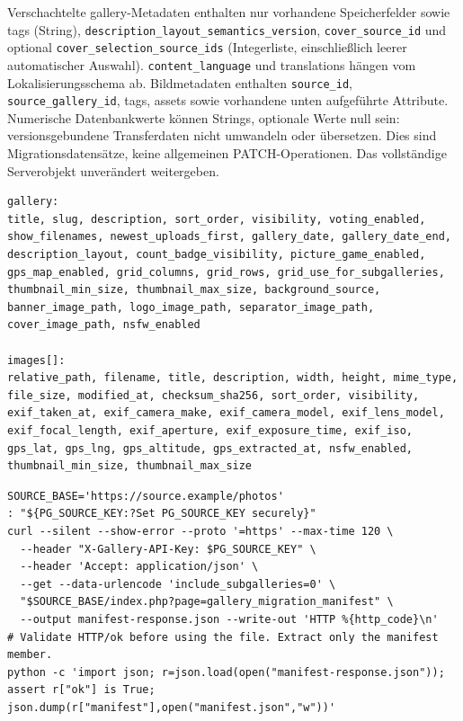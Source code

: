 \documentclass[11pt,a4paper]{article}
\newcommand{\codeword}[1]{\nolinkurl{#1}}
\begin{document}
Verschachtelte gallery-Metadaten enthalten nur vorhandene Speicherfelder sowie tags
(String), \codeword{description_layout_semantics_version}, \codeword{cover_source_id} und
optional \codeword{cover_selection_source_ids} (Integerliste, einschließlich leerer
automatischer Auswahl). \codeword{content_language} und translations hängen vom
Lokalisierungsschema ab. Bildmetadaten enthalten \codeword{source_id},
\codeword{source_gallery_id}, tags, assets sowie vorhandene unten aufgeführte Attribute.
Numerische Datenbankwerte können Strings, optionale Werte null sein: versionsgebundene
Transferdaten nicht umwandeln oder übersetzen. Dies sind Migrationsdatensätze, keine
allgemeinen PATCH-Operationen. Das vollständige Serverobjekt unverändert weitergeben.

\begin{lstlisting}[language={}]
gallery:
title, slug, description, sort_order, visibility, voting_enabled,
show_filenames, newest_uploads_first, gallery_date, gallery_date_end,
description_layout, count_badge_visibility, picture_game_enabled,
gps_map_enabled, grid_columns, grid_rows, grid_use_for_subgalleries,
thumbnail_min_size, thumbnail_max_size, background_source,
banner_image_path, logo_image_path, separator_image_path,
cover_image_path, nsfw_enabled

images[]:
relative_path, filename, title, description, width, height, mime_type,
file_size, modified_at, checksum_sha256, sort_order, visibility,
exif_taken_at, exif_camera_make, exif_camera_model, exif_lens_model,
exif_focal_length, exif_aperture, exif_exposure_time, exif_iso,
gps_lat, gps_lng, gps_altitude, gps_extracted_at, nsfw_enabled,
thumbnail_min_size, thumbnail_max_size
\end{lstlisting}

\begin{lstlisting}[language={}]
SOURCE_BASE='https://source.example/photos'
: "${PG_SOURCE_KEY:?Set PG_SOURCE_KEY securely}"
curl --silent --show-error --proto '=https' --max-time 120 \
  --header "X-Gallery-API-Key: $PG_SOURCE_KEY" \
  --header 'Accept: application/json' \
  --get --data-urlencode 'include_subgalleries=0' \
  "$SOURCE_BASE/index.php?page=gallery_migration_manifest" \
  --output manifest-response.json --write-out 'HTTP %{http_code}\n'
# Validate HTTP/ok before using the file. Extract only the manifest member.
python -c 'import json; r=json.load(open("manifest-response.json")); assert r["ok"] is True; json.dump(r["manifest"],open("manifest.json","w"))'
\end{lstlisting}
\end{document}
